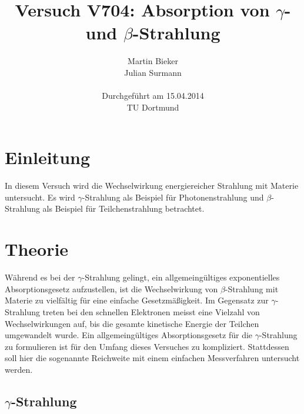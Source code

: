\documentclass[11pt,ngerman,a4paper]{article}
\title{\textbf{Versuch V704: Absorption von $\gamma$- und $\beta$-Strahlung}}
\author{Martin Bieker\\
		Julian Surmann\\
		\\
		Durchgef\"{u}hrt am 15.04.2014\\
		TU Dortmund}
\date{}
\begin{document}
\renewcommand\tablename{Tabelle}
\renewcommand\figurename{Abbildung}
\maketitle
\thispagestyle{empty}
\newpage
\clearpage
\setcounter{page}{1}


\section{Einleitung}
In diesem Versuch wird die Wechselwirkung energiereicher Strahlung mit Materie untersucht. Es wird $\gamma$-Strahlung als Beispiel für Photonenstrahlung und $\beta$-Strahlung als Beispiel für Teilchenstrahlung betrachtet.
\section{Theorie}
Während es bei der $\gamma$-Strahlung gelingt, ein allgemeingültiges exponentielles Absorptionsgesetz aufzustellen, ist die Wechselwirkung von $\beta$-Strahlung mit Materie zu vielfältig für eine einfache Gesetzmäßigkeit. Im Gegensatz zur $\gamma$-Strahlung treten bei den schnellen Elektronen meisst eine Vielzahl von Wechselwirkungen auf, bis die gesamte kinetische Energie der Teilchen umgewandelt wurde. Ein allgemeingültiges Absorptionsgesetz für die $\gamma$-Strahlung zu formulieren ist für den Umfang dieses Versuches zu kompliziert. Stattdessen soll hier die sogenannte Reichweite mit einem einfachen Messverfahren untersucht werden.
\subsection{$\gamma$-Strahlung}
\end{document}
